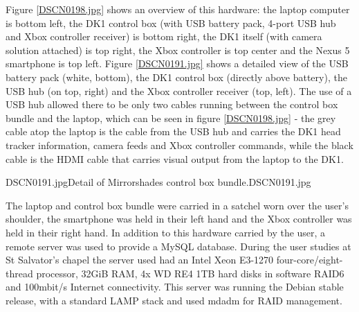 Figure \ref{DSCN0198.jpg} shows an overview of this hardware: the laptop computer is bottom left, the DK1 control box (with USB battery pack, 4-port USB hub and Xbox controller receiver) is bottom right, the DK1 itself (with camera solution attached) is top right, the Xbox controller is top center and the Nexus 5 smartphone is top left. Figure \ref{DSCN0191.jpg} shows a detailed view of the USB battery pack (white, bottom), the DK1 control box (directly above battery), the USB hub (on top, right) and the Xbox controller receiver (top, left). The use of a USB hub allowed there to be only two cables running between the control box bundle and the laptop, which can be seen in figure \ref{DSCN0198.jpg} - the grey cable atop the laptop is the cable from the USB hub and carries the DK1 head tracker information, camera feeds and Xbox controller commands, while the black cable is the HDMI cable that carries visual output from the laptop to the DK1.

       {DSCN0191.jpg}{Detail of Mirrorshades control box bundle.}{DSCN0191.jpg}

The laptop and control box bundle were carried in a satchel worn over the user's shoulder, the smartphone was held in their left hand and the Xbox controller was held in their right hand. In addition to this hardware carried by the user, a remote server was used to provide a MySQL database. During the user studies at St Salvator's chapel the server used had an Intel Xeon E3-1270 four-core/eight-thread processor, 32GiB RAM, 4x WD RE4 1TB hard disks in software RAID6 and 100mbit/s Internet connectivity. This server was running the Debian stable release, with a standard LAMP stack and used mdadm for RAID management.

